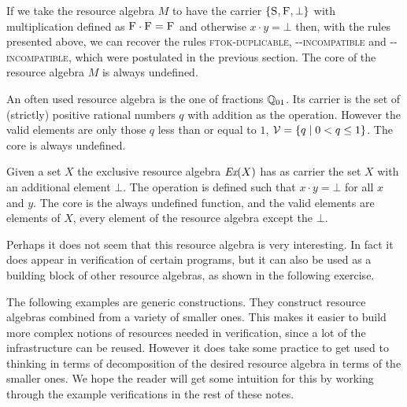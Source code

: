 \begin{example}
  \label{example:two-state-transition-system-ra}
  If we take the resource algebra $M$ to have the carrier $\{\textsc{S}, \textsc{F},\bot\}$ with multiplication defined as $\textsc{F} \cdot \textsc{F} = \textsc{F}$ and otherwise $x \cdot y = \bot$ then, with the rules presented above, we can recover the rules \textsc{ftok-duplicable}, \textsc{\stok-\stok-incompatible} and \textsc{\stok-\ftok-incompatible}, which were postulated in the previous section.
  The core of the resource algebra $M$ is always undefined.
\end{example}

\begin{example}
  \label{example:resource-algebra-of-fractions}
  An often used resource algebra is the one of fractions $\mathbb{Q}_{01}$.
  Its carrier is the set of (strictly) positive rational numbers $q$ with addition as the operation.
  However the valid elements are only those $q$ less than or equal to $1$, \ie{} ${\Vl = \left\{ q \isetsep 0 < q \leq 1 \right\}}$.
  The core is always undefined.
\end{example}

\begin{example}
  \label{ex:exclusive-resource-algebra}
  Given a set $X$ the exclusive resource algebra $\textit{Ex}(X)$ has as carrier the set $X$ with an additional element $\bot$.
  The operation is defined such that $x \cdot y = \bot$ for all $x$ and $y$.
  The core is the always undefined function, and the valid elements are elements of $X$, \ie{} every element of the resource algebra except the $\bot$.

  Perhaps it does not seem that this resource algebra is very interesting.
  In fact it does appear in verification of certain programs, but it can also be used as a building block of other resource algebras, as shown in the following exercise.
\end{example}

The following examples are generic constructions.
They construct resource algebras combined from a variety of smaller ones.
This makes it easier to build more complex notions of resources needed in verification, since a lot of the infrastructure can be reused.
However it does take some practice to get used to thinking in terms of decomposition of the desired resource algebra in terms of the smaller ones.
We hope the reader will get some intuition for this by working through the example verifications in the rest of these notes.

